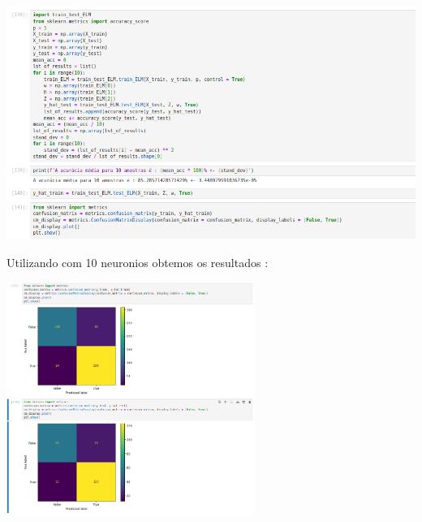 \documentclass{article}
\begin{document}
\begin{center}

\includegraphics[height=3in]{Ex6/Breast_Cancer/acc_5.png}
\vspace{10pt}

\end{center}

\vspace{5pt}
Utilizando com 10 neuronios obtemos os resultados : 

\begin{center}

\includegraphics[height=3in]{Ex6/Breast_Cancer/conf_matrix_10.png}
\vspace{10pt}

\end{center}
\end{document}

